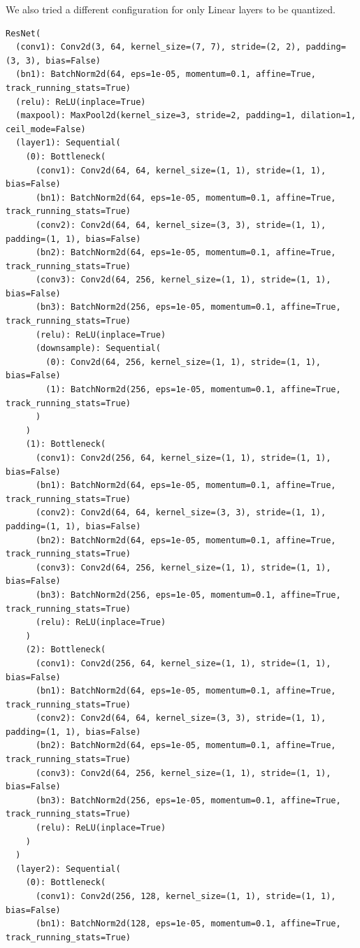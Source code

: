 \documentclass{article}
\begin{document}
We also tried a different configuration for only Linear layers to be quantized.
\begin{verbatim}
ResNet(
  (conv1): Conv2d(3, 64, kernel_size=(7, 7), stride=(2, 2), padding=(3, 3), bias=False)
  (bn1): BatchNorm2d(64, eps=1e-05, momentum=0.1, affine=True, track_running_stats=True)
  (relu): ReLU(inplace=True)
  (maxpool): MaxPool2d(kernel_size=3, stride=2, padding=1, dilation=1, ceil_mode=False)
  (layer1): Sequential(
    (0): Bottleneck(
      (conv1): Conv2d(64, 64, kernel_size=(1, 1), stride=(1, 1), bias=False)
      (bn1): BatchNorm2d(64, eps=1e-05, momentum=0.1, affine=True, track_running_stats=True)
      (conv2): Conv2d(64, 64, kernel_size=(3, 3), stride=(1, 1), padding=(1, 1), bias=False)
      (bn2): BatchNorm2d(64, eps=1e-05, momentum=0.1, affine=True, track_running_stats=True)
      (conv3): Conv2d(64, 256, kernel_size=(1, 1), stride=(1, 1), bias=False)
      (bn3): BatchNorm2d(256, eps=1e-05, momentum=0.1, affine=True, track_running_stats=True)
      (relu): ReLU(inplace=True)
      (downsample): Sequential(
        (0): Conv2d(64, 256, kernel_size=(1, 1), stride=(1, 1), bias=False)
        (1): BatchNorm2d(256, eps=1e-05, momentum=0.1, affine=True, track_running_stats=True)
      )
    )
    (1): Bottleneck(
      (conv1): Conv2d(256, 64, kernel_size=(1, 1), stride=(1, 1), bias=False)
      (bn1): BatchNorm2d(64, eps=1e-05, momentum=0.1, affine=True, track_running_stats=True)
      (conv2): Conv2d(64, 64, kernel_size=(3, 3), stride=(1, 1), padding=(1, 1), bias=False)
      (bn2): BatchNorm2d(64, eps=1e-05, momentum=0.1, affine=True, track_running_stats=True)
      (conv3): Conv2d(64, 256, kernel_size=(1, 1), stride=(1, 1), bias=False)
      (bn3): BatchNorm2d(256, eps=1e-05, momentum=0.1, affine=True, track_running_stats=True)
      (relu): ReLU(inplace=True)
    )
    (2): Bottleneck(
      (conv1): Conv2d(256, 64, kernel_size=(1, 1), stride=(1, 1), bias=False)
      (bn1): BatchNorm2d(64, eps=1e-05, momentum=0.1, affine=True, track_running_stats=True)
      (conv2): Conv2d(64, 64, kernel_size=(3, 3), stride=(1, 1), padding=(1, 1), bias=False)
      (bn2): BatchNorm2d(64, eps=1e-05, momentum=0.1, affine=True, track_running_stats=True)
      (conv3): Conv2d(64, 256, kernel_size=(1, 1), stride=(1, 1), bias=False)
      (bn3): BatchNorm2d(256, eps=1e-05, momentum=0.1, affine=True, track_running_stats=True)
      (relu): ReLU(inplace=True)
    )
  )
  (layer2): Sequential(
    (0): Bottleneck(
      (conv1): Conv2d(256, 128, kernel_size=(1, 1), stride=(1, 1), bias=False)
      (bn1): BatchNorm2d(128, eps=1e-05, momentum=0.1, affine=True, track_running_stats=True)

\end{verbatim}
\end{document}

